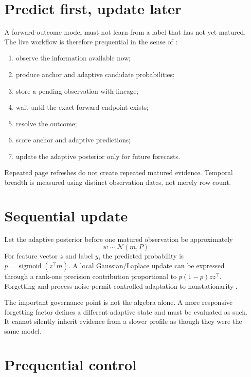 \documentclass[11pt]{article}
\newcommand{\sigmoid}{\operatorname{sigmoid}}
\begin{document}
\section{Predict first, update later}

A forward-outcome model must not learn from a label that has not yet matured. The live workflow is therefore prequential in the sense of \citet{dawid1984prequential}:

\begin{enumerate}
\item observe the information available now;
\item produce anchor and adaptive candidate probabilities;
\item store a pending observation with lineage;
\item wait until the exact forward endpoint exists;
\item resolve the outcome;
\item score anchor and adaptive predictions;
\item update the adaptive posterior only for future forecasts.
\end{enumerate}

Repeated page refreshes do not create repeated matured evidence. Temporal breadth is measured using distinct observation dates, not merely row count.

\section{Sequential update}

Let the adaptive posterior before one matured observation be approximately
\begin{equation}
w\sim\mathcal N(m,P).
\end{equation}
For feature vector $z$ and label $y$, the predicted probability is $p=\sigmoid(z^\top m)$. A local Gaussian/Laplace update can be expressed through a rank-one precision contribution proportional to $p(1-p)zz^\top$. Forgetting and process noise permit controlled adaptation to nonstationarity \citep{mccormick2012dynamic,penny1999dynamic}.

The important governance point is not the algebra alone. A more responsive forgetting factor defines a different adaptive state and must be evaluated as such. It cannot silently inherit evidence from a slower profile as though they were the same model.

\section{Prequential control}
\end{document}
